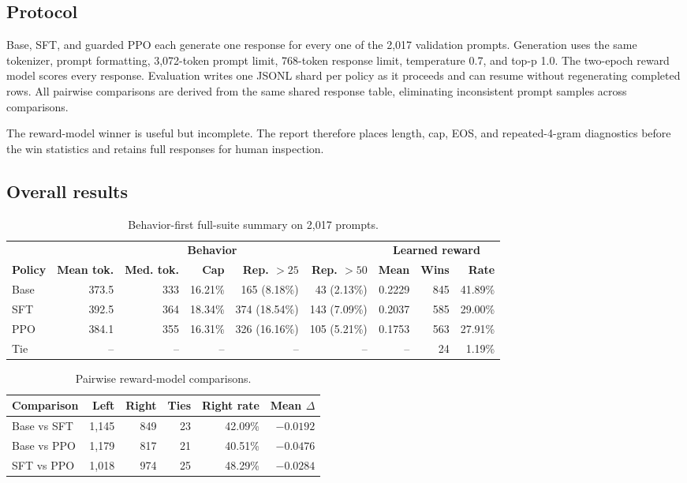 \documentclass[11pt]{article}
\begin{document}
\subsection{Protocol}

Base, SFT, and guarded PPO each generate one response for every one of the
2,017 validation prompts. Generation uses the same tokenizer, prompt formatting,
3,072-token prompt limit, 768-token response limit, temperature 0.7, and top-p
1.0. The two-epoch reward model scores every response. Evaluation writes one
JSONL shard per policy as it proceeds and can resume without regenerating
completed rows. All pairwise comparisons are derived from the same shared
response table, eliminating inconsistent prompt samples across comparisons.

The reward-model winner is useful but incomplete. The report therefore places
length, cap, EOS, and repeated-4-gram diagnostics before the win statistics and
retains full responses for human inspection.

\subsection{Overall results}

\begin{table}[H]
\centering
\small
\caption{Behavior-first full-suite summary on 2,017 prompts.}
\label{tab:overall}
\begin{tabular}{@{}lrrrrrrrr@{}}
\toprule
 & \multicolumn{5}{c}{\textbf{Behavior}} & \multicolumn{3}{c}{\textbf{Learned reward}}\\
\cmidrule(lr){2-6}\cmidrule(l){7-9}
\textbf{Policy} & \textbf{Mean tok.} & \textbf{Med. tok.} & \textbf{Cap} &
\textbf{Rep. $>25$} & \textbf{Rep. $>50$} & \textbf{Mean} &
\textbf{Wins} & \textbf{Rate}\\
\midrule
Base & 373.5 & 333 & 16.21\% & 165 (8.18\%) & 43 (2.13\%) & 0.2229 & 845 & 41.89\%\\
SFT & 392.5 & 364 & 18.34\% & 374 (18.54\%) & 143 (7.09\%) & 0.2037 & 585 & 29.00\%\\
PPO & 384.1 & 355 & 16.31\% & 326 (16.16\%) & 105 (5.21\%) & 0.1753 & 563 & 27.91\%\\
Tie & -- & -- & -- & -- & -- & -- & 24 & 1.19\%\\
\bottomrule
\end{tabular}
\end{table}

\begin{table}[H]
\centering
\caption{Pairwise reward-model comparisons.}
\label{tab:pairwise}
\begin{tabular}{@{}lrrrrr@{}}
\toprule
\textbf{Comparison} & \textbf{Left} & \textbf{Right} & \textbf{Ties} &
\textbf{Right rate} & \textbf{Mean $\Delta$}\\
\midrule
Base vs SFT & 1,145 & 849 & 23 & 42.09\% & $-0.0192$\\
Base vs PPO & 1,179 & 817 & 21 & 40.51\% & $-0.0476$\\
SFT vs PPO & 1,018 & 974 & 25 & 48.29\% & $-0.0284$\\
\bottomrule
\end{tabular}
\end{table}
\end{document}
